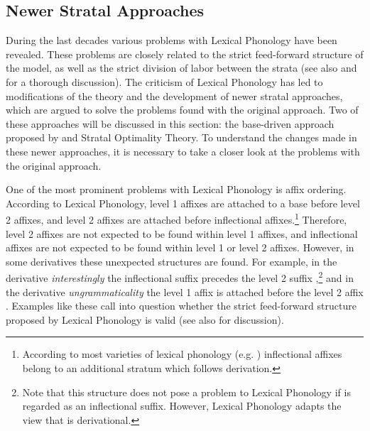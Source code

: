 \subsection{Newer Stratal Approaches}

During the last decades various problems with Lexical Phonology have been revealed. These problems are closely related to the strict feed-forward structure of the model, as well as the strict division of labor between the strata (see also \citet[chapter 2]{Giegerich.1999} and \citet[chapter 7]{Plag.2003} for a thorough discussion). The criticism of Lexical Phonology has led to modifications of the theory and the development of newer stratal approaches, which are argued to solve the problems found with the original approach. Two of these approaches will be discussed in this section: the base-driven approach proposed by \cite{Giegerich.1999} and Stratal Optimality Theory. To understand the changes made in these newer approaches, it is necessary to take a closer look at the problems with the original approach.

One of the most prominent problems with Lexical Phonology is affix ordering. According to Lexical Phonology, level 1 affixes are attached to a base before level 2 affixes, and level 2 affixes are attached before inflectional affixes.\footnote{According to most varieties of lexical phonology (e.g.  \citealt{Kiparsky.1982,Mohanan.1986}) inflectional affixes belong to an additional stratum which follows derivation.} Therefore, level 2 affixes are not expected to be found within level 1 affixes, and inflectional affixes are not expected to be found within level 1 or level 2 affixes. However, in some derivatives these unexpected structures are found. For example, in the derivative \textit{interestingly} the inflectional suffix  precedes the level 2 suffix ,\footnote{Note that this structure does not pose a problem to Lexical Phonology if  is regarded as an inflectional suffix. However, Lexical Phonology adapts the view that  is derivational. } and in the derivative \textit{ungrammaticality} the level 1 affix  is attached before the level 2 affix . Examples like these call into question whether the strict feed-forward structure proposed by Lexical Phonology is valid (see also \citet[chapter 4]{Plag.1999} for discussion).

